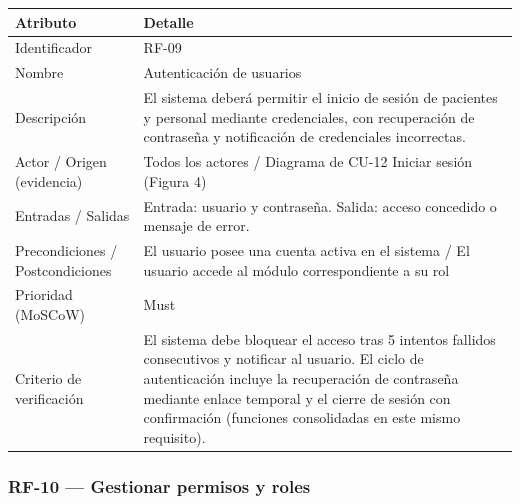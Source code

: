 \documentclass[11pt,a4paper]{article}
\begin{document}
	\begin{longtable}{p{} p{}}
		
		\toprule
		\textbf{Atributo} & \textbf{Detalle} \\
		\midrule
		\endhead
		
		Identificador & RF-09 \\
		Nombre & Autenticación de usuarios \\
		Descripción & El sistema deberá permitir el inicio de sesión de pacientes y personal mediante credenciales, con recuperación de contraseña y notificación de credenciales incorrectas. \\
		Actor / Origen (evidencia) & Todos los actores / Diagrama de CU-12 Iniciar sesión (Figura 4) \\
		Entradas / Salidas & Entrada: usuario y contraseña. Salida: acceso concedido o mensaje de error. \\
		Precondiciones / Postcondiciones & El usuario posee una cuenta activa en el sistema / El usuario accede al módulo correspondiente a su rol \\
		Prioridad (MoSCoW) & Must \\
		Criterio de verificación & El sistema debe bloquear el acceso tras 5 intentos fallidos consecutivos y notificar al usuario. El ciclo de autenticación incluye la recuperación de contraseña mediante enlace temporal y el cierre de sesión con confirmación (funciones consolidadas en este mismo requisito). \\
		\bottomrule
	\end{longtable}
	
	\subsubsection{RF-10 --- Gestionar permisos y roles}
	
\end{document}
